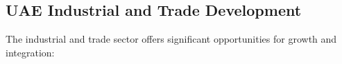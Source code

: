 %
%

\subsection{UAE Industrial and Trade Development}\label{subsec:uae-trade}

The industrial and trade sector offers significant opportunities for growth and integration:


